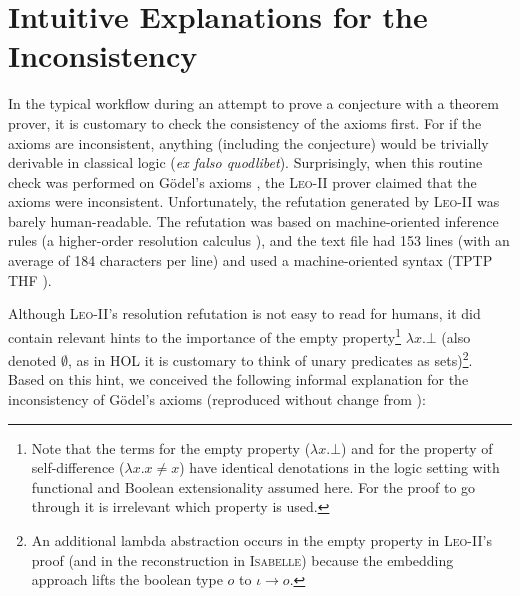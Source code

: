 \documentclass{llncs}
\newcommand{\imp}{{\rightarrow}}
\begin{document}
\section{Intuitive Explanations for the Inconsistency} 
\label{sec:inconsistency}

In the typical workflow during an attempt to prove a conjecture with a
theorem prover, it is customary to check the consistency of the axioms
first. For if the axioms are inconsistent, anything (including the
conjecture) would be trivially derivable in classical logic (\emph{ex
  falso quodlibet}). Surprisingly, when this routine check was
performed on G\"odel's axioms \cite{C40}, the \textsc{Leo-II} prover
claimed that the axioms were inconsistent. Unfortunately, the
refutation generated by \textsc{Leo-II} was barely human-readable. The
refutation was based on machine-oriented inference rules (a higher-order resolution calculus \cite{J30}), and the
text file had 153 lines (with an average of 184
  characters per line) and used a machine-oriented syntax (TPTP THF
\cite{J22}). 


Although \textsc{Leo-II}'s resolution refutation is not easy to read
for humans, it did contain relevant hints to the importance of the
empty property\footnote{
  Note that the terms for the empty property ($\lambda x. \bot$) and for the property of self-difference ($\lambda x.  x\not=x$) have identical denotations in the logic setting
  with functional and Boolean extensionality assumed
  here. 
  For the proof to go through it is
  irrelevant which property is used.
} $\lambda x. \bot$ (also denoted $\emptyset$, as in HOL it is customary to think of unary predicates as sets)\footnote{An additional lambda abstraction occurs in the empty property in \textsc{Leo-II}'s proof (and in the reconstruction in \textsc{Isabelle}) because the embedding approach lifts the boolean type $o$ to $\iota \imp o$.}. Based on this hint, we conceived the following informal explanation for the inconsistency of G\"odel's axioms (reproduced without change from \cite{C55}):
%
\end{document}
